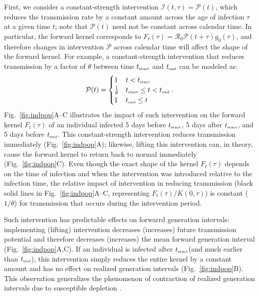 \documentclass[12pt]{article}
\newcommand{\fref}[1]{Fig.~\ref{fig:#1}}
\newcommand{\Rx}[1]{\ensuremath{{\mathcal R}_{#1}}\xspace}
\newcommand{\Ro}{\Rx{0}}
\newcommand{\tsub}[2]{#1_{{\textrm{\tiny #2}}}}
\newcommand{\tstart}{\ensuremath{\tsub{t}{start}}\xspace}
\newcommand{\tend}{\ensuremath{\tsub{t}{end}}\xspace}
\newcommand{\PP}{\ensuremath{\mathcal P}}
\newcommand{\II}{\ensuremath{\mathcal I}}
\begin{document}
First, we consider a constant-strength intervention $\II(t, \tau) = \PP(t)$, which reduces the transmission rate by a constant amount across the age of infection $\tau$ at a given time $t$; note that $\PP(t)$ need not be constant across calendar time.
In particular, the forward kernel corresponds to $F_t(\tau) =  \Ro \PP(t+\tau) g_0(\tau)$, and therefore changes in intervention $\PP$ across calendar time will affect the shape of the forward kernel.
For example, a constant-strength intervention that reduces transmission by a factor of $\theta$ between time \tstart and \tend can be modeled as:
\begin{equation}
\PP(t) = \begin{cases}
1 & t < \tstart\\
\frac{1}{\theta} & \tstart \leq t < \tend\\
1 & \tend \leq t
\end{cases}.
\end{equation}
\fref{indpop}A--C illustrates the impact of such intervention on the forward kernel $F_t(\tau)$ of an individual infected 5 days before $\tstart$, 5 days after $\tstart$, and 5 days before $\tend$.
This constant-strength intervention reduces transmission immediately (\fref{indpop}A);
likewise, lifting this intervention can, in theory, cause the forward kernel to return back to normal immediately (\fref{indpop}C).
Even though the exact shape of the kernel $F_t(\tau)$ depends on the time of infection and when the intervention was introduced relative to the infection time, the relative impact of intervention in reducing transmission (black solid lines in \fref{indpop}A--C, representing $F_t(\tau)/K(0, \tau)$) is constant ($1/\theta$) for transmission that occurs during the intervention period.

Such intervention has predictable effects on forwarrd generation intervals:
implementing (lifting) intervention decreases (increases) future transmission potential and therefore decreases (increases) the mean forward generation interval (\fref{indpop}A,C).
If an individual is infected after \tstart (and much earlier than \tend), this intervention simply reduces the entire kernel by a constant amount and has no effect on realized generation intervals (\fref{indpop}B).
This observation generalizes the phenomenon of contraction of realized generation intervals due to susceptible depletion \citep{kenah2008generation,nishiura2010time,champredon2015intrinsic}.
\end{document}
